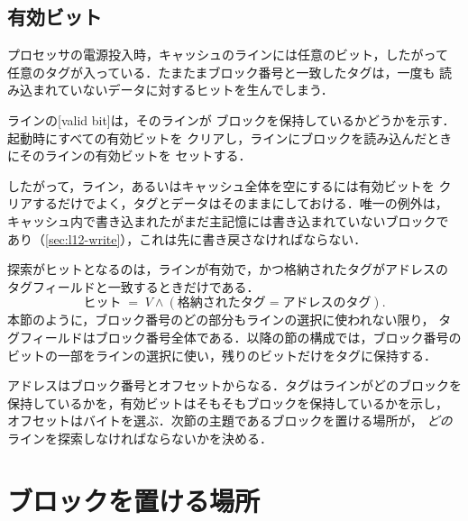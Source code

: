 \documentclass[../main.tex]{subfiles}
\begin{document}
\subsection{有効ビット}

プロセッサの電源投入時，キャッシュのラインには任意のビット，したがって
任意のタグが入っている．たまたまブロック番号と一致したタグは，一度も
読み込まれていないデータに対するヒットを生んでしまう．

\begin{definition}[有効ビット]
  ラインの[valid bit]は，そのラインが
  ブロックを保持しているかどうかを示す．起動時にすべての有効ビットを
  クリアし，ラインにブロックを読み込んだときにそのラインの有効ビットを
  セットする．
\end{definition}

したがって，ライン，あるいはキャッシュ全体を空にするには有効ビットを
クリアするだけでよく，タグとデータはそのままにしておける．唯一の例外は，
キャッシュ内で書き込まれたがまだ主記憶には書き込まれていないブロックで
あり（\cref{sec:l12-write}），これは先に書き戻さなければならない．%

探索がヒットとなるのは，ラインが有効で，かつ格納されたタグがアドレスの
タグフィールドと一致するときだけである．
\begin{equation}
  \text{ヒット} \;=\; V \wedge (\text{格納されたタグ} = \text{アドレスのタグ}) .
  \label{eq:l12-hit}
\end{equation}
本節のように，ブロック番号のどの部分もラインの選択に使われない限り，
タグフィールドはブロック番号全体である．以降の節の構成では，ブロック番号の
ビットの一部をラインの選択に使い，残りのビットだけをタグに保持する．

\begin{keypoint}
  アドレスはブロック番号とオフセットからなる．タグはラインがどのブロックを
  保持しているかを，有効ビットはそもそもブロックを保持しているかを示し，
  オフセットはバイトを選ぶ．次節の主題であるブロックを置ける場所が，
  \emph{どの}ラインを探索しなければならないかを決める．
\end{keypoint}

\section{ブロックを置ける場所}
\label{sec:l12-placement}
\end{document}
